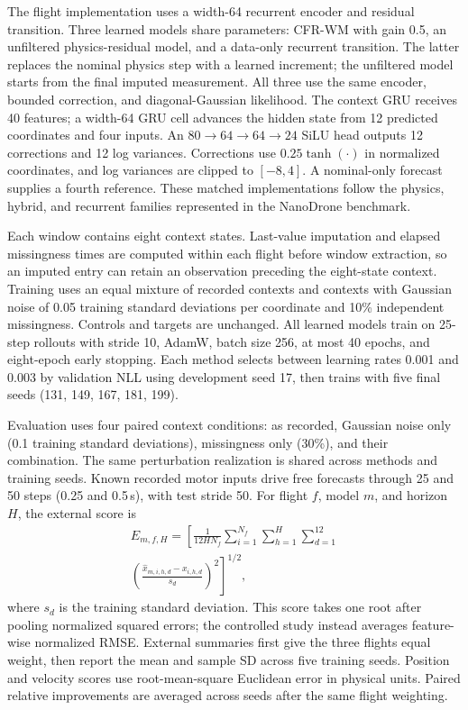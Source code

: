 The flight implementation uses a width-64 recurrent encoder and residual
transition. Three learned models share \ExternalLearnedParameters{} parameters:
CFR-WM with gain 0.5, an unfiltered physics-residual model, and a data-only
recurrent transition. The latter replaces the nominal physics step with a
learned increment; the unfiltered model starts from the final imputed
measurement. All three use the same encoder, bounded correction, and
diagonal-Gaussian likelihood. The context GRU receives 40 features; a
width-64 GRU cell advances the hidden state from 12 predicted coordinates and
four inputs. An $80\!\to\!64\!\to\!64\!\to\!24$ SiLU head outputs
12 corrections and 12 log variances. Corrections use $0.25\tanh(\cdot)$ in
normalized coordinates, and log variances are clipped to $[-8,4]$.
A nominal-only forecast supplies a fourth
reference. These matched implementations follow the physics, hybrid, and
recurrent families represented in the NanoDrone benchmark.

Each window contains eight context states. Last-value imputation and elapsed
missingness times are computed within each flight before window extraction,
so an imputed entry can retain an observation preceding the eight-state
context. Training uses an equal mixture of recorded contexts and contexts
with Gaussian noise of 0.05 training standard deviations per coordinate and
10\% independent missingness. Controls and targets are unchanged. All learned
models train on 25-step rollouts with stride 10, AdamW, batch size 256, at most
40 epochs, and eight-epoch early stopping. Each method selects between
learning rates 0.001 and 0.003 by validation NLL using development seed 17,
then trains with five final seeds (131, 149, 167, 181, 199).

Evaluation uses four paired context conditions: as recorded, Gaussian noise
only (0.1 training standard deviations), missingness only (30\%), and their
combination. The same perturbation realization is shared across methods and
training seeds. Known recorded motor inputs drive free forecasts through
25 and 50 steps (0.25 and 0.5\,s), with test stride 50. For flight $f$, model
$m$, and horizon $H$, the external score is
\begin{equation}
\begin{aligned}
 E_{m,f,H}=\left[\frac{1}{12H N_f}
 \sum_{i=1}^{N_f}\sum_{h=1}^{H}\sum_{d=1}^{12}\right.\\[-0.2em]
 \left.\left(\frac{\widehat{x}_{m,i,h,d}-x_{i,h,d}}{s_d}\right)^2
 \right]^{1/2},
\end{aligned}
 \label{eq:external-score}
\end{equation}
where $s_d$ is the training standard deviation. This score takes one root
after pooling normalized squared errors; the controlled study instead
averages feature-wise normalized RMSE. External summaries first give the
three flights equal weight, then report the mean and sample SD across five
training seeds. Position and velocity scores use root-mean-square Euclidean
error in physical units. Paired relative improvements are averaged across
seeds after the same flight weighting.

